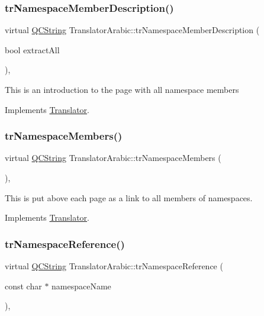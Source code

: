 \subsubsection{\texorpdfstring{trNamespaceMemberDescription()}{trNamespaceMemberDescription()}}
{\footnotesize\ttfamily virtual \mbox{\hyperlink{class_q_c_string}{Q\+C\+String}} Translator\+Arabic\+::tr\+Namespace\+Member\+Description (\begin{DoxyParamCaption}\item[{bool}]{extract\+All }\end{DoxyParamCaption})\hspace{0.3cm}{\ttfamily [inline]}, {\ttfamily [virtual]}}

This is an introduction to the page with all namespace members 

Implements \mbox{\hyperlink{class_translator}{Translator}}.

\mbox{\label{class_translator_arabic_a165f528cf438e8258be63bf31529d5ba}} 
\subsubsection{\texorpdfstring{trNamespaceMembers()}{trNamespaceMembers()}}
{\footnotesize\ttfamily virtual \mbox{\hyperlink{class_q_c_string}{Q\+C\+String}} Translator\+Arabic\+::tr\+Namespace\+Members (\begin{DoxyParamCaption}{ }\end{DoxyParamCaption})\hspace{0.3cm}{\ttfamily [inline]}, {\ttfamily [virtual]}}

This is put above each page as a link to all members of namespaces. 

Implements \mbox{\hyperlink{class_translator}{Translator}}.

\mbox{\label{class_translator_arabic_ab1685de25aa975dd9481494a1fd5dc86}} 
\subsubsection{\texorpdfstring{trNamespaceReference()}{trNamespaceReference()}}
{\footnotesize\ttfamily virtual \mbox{\hyperlink{class_q_c_string}{Q\+C\+String}} Translator\+Arabic\+::tr\+Namespace\+Reference (\begin{DoxyParamCaption}\item[{const char $\ast$}]{namespace\+Name }\end{DoxyParamCaption})\hspace{0.3cm}{\ttfamily [inline]}, {\ttfamily [virtual]}}

